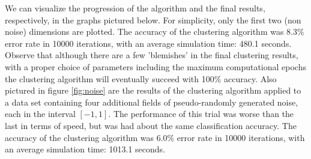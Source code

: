 \documentclass[english]{article}
\begin{document}
We can visualize the progression of the algorithm and the final results,
respectively, in the graphs pictured below. For simplicity, only the
first two (non noise) dimensions are plotted. The accuracy of the
clustering algorithm was 8.3\% error rate in 10000 iterations, with
an average simulation time: 480.1 seconds. Observe that although there
are a few 'blemishes' in the final clustering results, with a proper
choice of parameters including the maximum computational epochs the
clustering algorithm will eventually succeed with 100\% accuracy.
Also pictured in figure \ref{fig:noise} are the results of the clustering
algorithm applied to a data set containing four additional fields
of pseudo-randomly generated noise, each in the interval $[-1,1]$.
The performance of this trial was worse than the last in terms of
speed, but was had about the same classification accuracy. The accuracy
of the clustering algorithm was 6.0\% error rate in 10000 iterations,
with an average simulation time: 1013.1 seconds.
\end{document}
